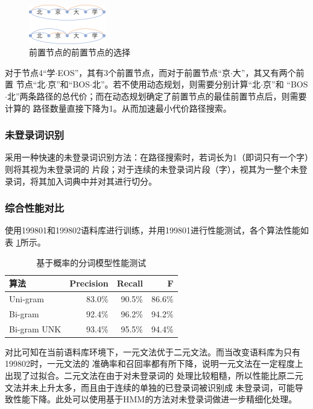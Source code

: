 \begin{figure}[H]
  \centering
  \includegraphics[width=0.3\textwidth]{figures/figure_08.png}
  \caption{前置节点的前置节点的选择}
  \label{p6}
\end{figure}

对于节点4“学$\cdot$EOS”，其有3个前置节点，而对于前置节点“京$\cdot$大”，其又有两个前置
节点“北$\cdot$京”和“BOS$\cdot$北”。若不使用动态规划，则需要分别计算“北$\cdot$京”和
“BOS$\cdot$北”两条路径的总代价；而在动态规划确定了前置节点的最佳前置节点后，则需要计算的
路径数量直接下降为1。从而加速最小代价路径搜索。

\subsubsection{未登录词识别}

采用一种快速的未登录词识别方法：在路径搜索时，若词长为1（即词只有一个字）则将其视为未登录词的
片段；对于连续的未登录词片段（字），视其为一整个未登录词，将其加入词典中并对其进行切分。

\subsubsection{综合性能对比}

使用199801和199802语料库进行训练，并用199801进行性能测试，各个算法性能如表
\ref{seg_evaluate2}所示。

\begin{table}[H]
  \centering
  \begin{tabular}{lrrr}
    \hline
    \textbf{算法} & \textbf{Precision} & \textbf{Recall} & \textbf{F} \\
    \hline
    Uni-gram      & 83.0\%             & 90.5\%          & 86.6\%     \\
    Bi-gram       & 92.4\%             & 96.2\%          & 94.2\%     \\
    Bi-gram UNK   & 93.4\%             & 95.5\%          & 94.4\%     \\
    \hline
  \end{tabular}
  \caption{基于概率的分词模型性能测试}
  \label{seg_evaluate2}
\end{table}

对比可知在当前语料库环境下，一元文法优于二元文法。而当改变语料库为只有199802时，一元文法的
准确率和召回率都有所下降，说明一元文法在一定程度上出现了过拟合。二元文法在由于对未登录词的
处理比较粗糙，所以性能比原二元文法并未上升太多，而且由于连续的单独的已登录词被识别成
未登录词，可能导致性能下降。此处可以使用基于HMM的方法对未登录词做进一步精细化处理。
